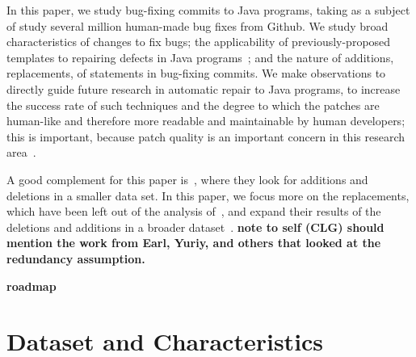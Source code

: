 \documentclass{sig-alternate-05-2015}
\newcommand{\todo}[1]
  {{\scriptsize \textbf{\color{red} {#1}}}}
\begin{document}
In this paper, we study bug-fixing commits to Java programs, taking as a subject
of study several million human-made bug fixes from Github. We study broad
characteristics of changes to fix bugs; the applicability of previously-proposed
templates to repairing defects in Java programs~\cite{kim2013}; and the nature
of additions, replacements, of statements in bug-fixing commits. We make
observations to directly guide future research in automatic repair to Java
programs, to increase the success rate of such techniques and the degree to
which the patches are human-like and therefore more readable and maintainable by
human developers; this is important, because patch quality is an important
concern in this research area~\cite{Qi2013}.


A good complement for this paper is~\cite{zhong2015}, where they look for
additions and deletions in a smaller data set. In this paper, we focus more on
the replacements, which have been left out of the analysis of~\cite{zhong2015},
and expand their results of the deletions and additions in a broader
dataset~\cite{dyer2013}.
\todo{note to self (CLG) should mention the work from Earl, Yuriy, and others
  that looked at the redundancy assumption.}

\todo{roadmap}

\section{Dataset and Characteristics}
\end{document}
